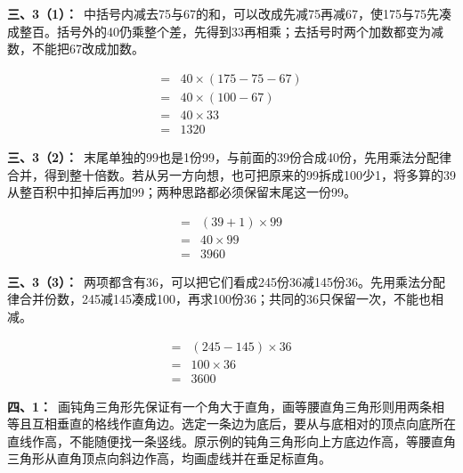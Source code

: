 \documentclass[multi=snippet,border=0pt]{standalone}
\newenvironment{snippet}[3]{\begin{minipage}{#1bp}\color{answerred}\fontsize{#2}{#3}\selectfont\raggedright}{\end{minipage}}
\begin{document}
\begin{snippet}{505}{11.5}{14}\textbf{三、3（1）：}\ 中括号内减去75与67的和，可以改成先减75再减67，使175与75先凑成整百。括号外的40仍乘整个差，先得到33再相乘；去括号时两个加数都变为减数，不能把67改成加数。\end{snippet}
\begin{snippet}{172.567}{10.5}{12.8}\[\begin{aligned}={}&40\times(175-75-67)\\={}&40\times(100-67)\\={}&40\times33\\={}&1320\end{aligned}\]\end{snippet}
\begin{snippet}{505}{11.5}{14}\textbf{三、3（2）：}\ 末尾单独的99也是1份99，与前面的39份合成40份，先用乘法分配律合并，得到整十倍数。若从另一方向想，也可把原来的99拆成100少1，将多算的39从整百积中扣掉后再加99；两种思路都必须保留末尾这一份99。\end{snippet}
\begin{snippet}{125.56700000000001}{10.5}{12.8}\[\begin{aligned}={}&(39+1)\times99\\={}&40\times99\\={}&3960\end{aligned}\]\end{snippet}
\begin{snippet}{505}{11.5}{14}\textbf{三、3（3）：}\ 两项都含有36，可以把它们看成245份36减145份36。先用乘法分配律合并份数，245减145凑成100，再求100份36；共同的36只保留一次，不能也相减。\end{snippet}
\begin{snippet}{192.733}{10.5}{12.8}\[\begin{aligned}={}&(245-145)\times36\\={}&100\times36\\={}&3600\end{aligned}\]\end{snippet}
\begin{snippet}{505}{11.5}{14}\textbf{四、1：}\ 画钝角三角形先保证有一个角大于直角，画等腰直角三角形则用两条相等且互相垂直的格线作直角边。选定一条边为底后，要从与底相对的顶点向底所在直线作高，不能随便找一条竖线。原示例的钝角三角形向上方底边作高，等腰直角三角形从直角顶点向斜边作高，均画虚线并在垂足标直角。\end{snippet}
\end{document}
